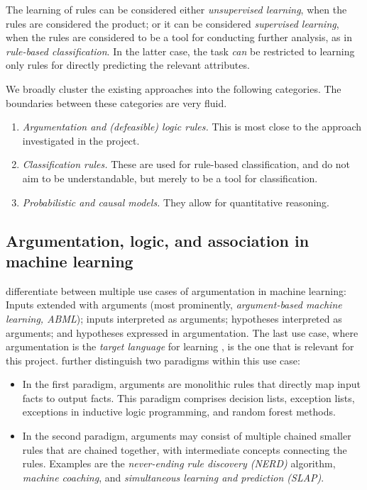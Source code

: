 The learning of rules can be considered either \textit{unsupervised learning}, when the rules are considered the product; or it can be considered \textit{supervised learning}, when the rules are considered to be a tool for conducting further analysis, as in \textit{rule-based classification}. In the latter case, the task \textit{can} be restricted to learning only rules for directly predicting the relevant attributes.

We broadly cluster the existing approaches into the following categories. The boundaries between these categories are very fluid.

\begin{enumerate}
    \item \textit{Argumentation and (defeasible) logic rules.} This is most close to the approach investigated in the project.
    \item \textit{Classification rules.} These are used for rule-based classification, and do not aim to be understandable, but merely to be a tool for classification. 
    \item \textit{Probabilistic and causal models.} They allow for quantitative reasoning.
\end{enumerate}

\subsection{Argumentation, logic, and association in machine learning}

\citet{kakasAbductionArgumentationExplainable2020} differentiate between multiple use cases of argumentation in machine learning: Inputs extended with arguments (most prominently, \textit{argument-based machine learning, ABML}); inputs interpreted as arguments; hypotheses interpreted as arguments; and hypotheses expressed in argumentation. The last use case, where argumentation is the \textit{target language} for learning \citep[p.~17]{kakasAbductionArgumentationExplainable2020}, is the one that is relevant for this project. \citet{kakasAbductionArgumentationExplainable2020} further distinguish two paradigms within this use case: 

\begin{itemize}
    \item In the first paradigm, arguments are monolithic rules that directly map input facts to output facts. This paradigm comprises decision lists, exception lists, exceptions in inductive logic programming, and random forest methods.
    \item In the second paradigm, arguments may consist of multiple chained smaller rules that are chained together, with intermediate concepts connecting the rules. Examples are the \textit{never-ending rule discovery (NERD)} algorithm, \textit{machine coaching}, and \textit{simultaneous learning and prediction (SLAP)}. 
\end{itemize}

